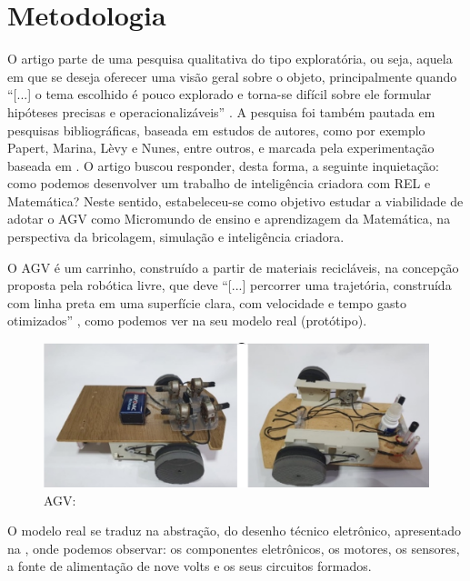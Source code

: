 \documentclass[portuguese]{textolivre}
\begin{document}
\section{Metodologia}\label{sec-modelo}
O artigo parte de uma pesquisa qualitativa do tipo exploratória, ou seja, aquela em que se deseja oferecer uma visão geral sobre o objeto, principalmente quando “[...] o tema escolhido é pouco explorado e torna-se difícil sobre ele formular hipóteses precisas e operacionalizáveis” \cite[p. 27]{GilAntonio2008}. A pesquisa foi também pautada em pesquisas bibliográficas, baseada em estudos de autores, como por exemplo Papert, Marina, Lèvy e Nunes, entre outros, e marcada pela experimentação baseada em \textcite{Guimaraes2020}. O artigo buscou responder, desta forma, a seguinte inquietação: como podemos desenvolver um trabalho de inteligência criadora com REL e Matemática? Neste sentido, estabeleceu-se como objetivo estudar a viabilidade de adotar o AGV como Micromundo de ensino e aprendizagem da Matemática, na perspectiva da bricolagem, simulação e inteligência criadora. 

O AGV é um carrinho, construído a partir de materiais recicláveis, na concepção proposta pela robótica livre, que deve “[...] percorrer uma trajetória, construída com linha preta em uma superfície clara, com velocidade e tempo gasto otimizados” \cite[p. 5]{Guimaraes2020}, como podemos ver na  seu modelo real (protótipo).

\begin{figure}[htbp]
\centering
\begin{minipage}{.8\textwidth}
 \includegraphics[width=\textwidth]{figuras/figura 1.png} 
 \caption{AGV:}
 \label{figura01}
\end{minipage}
\end{figure}

O modelo real se traduz na abstração, do desenho técnico eletrônico, apresentado na , onde podemos observar: os componentes eletrônicos, os motores, os sensores, a fonte de alimentação de nove volts e os seus circuitos formados.
\end{document}
